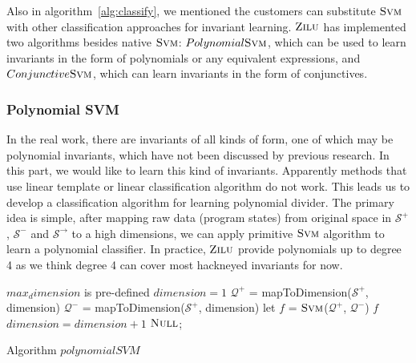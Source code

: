 Also in algorithm~\ref{alg:classify}, we mentioned the customers can substitute $\textsc{Svm}$ with other classification approaches for invariant learning.
$\textsc{Zilu}$ has implemented two algorithms besides native $\textsc{Svm}$: 
$Polynomial \textsc{Svm}$, which can be used to learn invariants in the form of polynomials or any equivalent expressions,
and $Conjunctive \textsc{Svm}$, which can learn invariants in the form of conjunctives.

\subsubsection{Polynomial SVM}
In the real work, there are invariants of all kinds of form, one of which may be polynomial invariants, which have not been discussed by previous research.
In this part, we would like to learn this kind of invariants.
Apparently methods that use linear template or linear classification algorithm do not work.
This leads us to develop a classification algorithm for learning polynomial divider.
The primary idea is simple, after mapping raw data (program states) from original space in $\mathcal{S}^+$, $\mathcal{S}^-$ and $\mathcal{S}^\rightarrow$ to a high dimensions, 
we can apply primitive $\textsc{Svm}$ algorithm to learn a polynomial classifier. 
In practice, $\textsc{Zilu}$ provide polynomials up to degree 4 as we think degree 4 can cover most hackneyed invariants for now.

\begin{algorithm}[!h]
\SetAlgoVlined
\Indm
{}
\Indp
    $max_dimension$ is pre-defined\;
    $dimension = 1$\;
     {
        $\mathcal{Q}^+$ = mapToDimension($\mathcal{S}^+$, dimension)\;
        $\mathcal{Q}^-$ = mapToDimension($\mathcal{S}^+$, dimension)\;
        let $f$ = $\textsc{Svm}$($\mathcal{Q}^+$, $\mathcal{Q}^-$)\;
         {
        	\Return $f$\;
    	}
    	$dimension = dimension + 1$\;
    }
    \Return $\textsc{Null}$;
\caption{Algorithm $polynomialSVM$}
\label{alg:polynomialSVM}
\end{algorithm}

